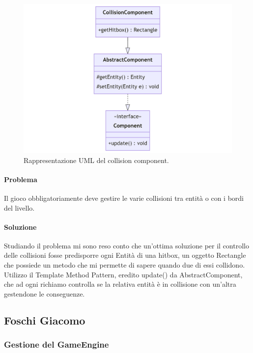 \documentclass[a4paper,12pt]{report}
\begin{document}
\begin{figure}[H]
\centering{}
\includegraphics[width=\textwidth]{img/collision.png}
\caption{Rappresentazione UML del collision component.}
\end{figure}

\paragraph{Problema} Il gioco obbligatoriamente deve gestire le varie collisioni tra entità o con i bordi del livello.

\paragraph{Soluzione} Studiando il problema mi sono reso conto che un’ottima soluzione per il controllo delle collisioni fosse predisporre ogni Entità di una hitbox, un oggetto Rectangle che possiede un metodo che mi permette di sapere quando due di essi collidono. Utilizzo il Template Method Pattern, eredito update() da AbstractComponent, che ad ogni richiamo controlla se la relativa entità è in collisione con un’altra gestendone le conseguenze.

\subsection{Foschi Giacomo}

\subsubsection{Gestione del GameEngine}
\end{document}
